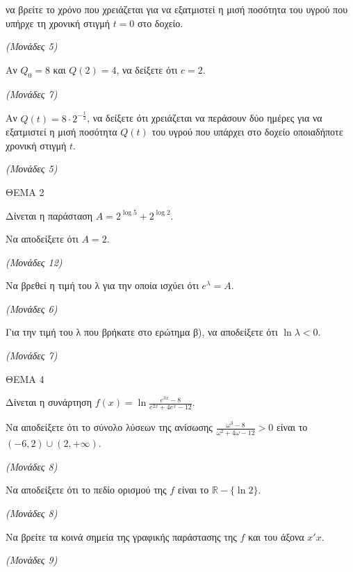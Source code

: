 \documentclass[11pt,a4paper,twoside]{book}
\newcommand{\monades}[1]{\hfill \textit{(Μονάδες #1)}}
\begin{document}
\begin{alist}
\item
  να βρείτε το χρόνο που χρειάζεται για να εξατμιστεί η μισή ποσότητα του υγρού που υπήρχε τη χρονική στιγμή $t = 0$ στο δοχείο.

\monades{5}

\item Αν $Q_{0} = 8$ και $Q(2) = 4$, να δείξετε ότι $c = 2$.

\monades{7}

\item Αν $Q(t) = 8 \cdot 2^{- \frac{t}{2}}$, να δείξετε ότι χρειάζεται να περάσουν δύο ημέρες για να εξατμιστεί η μισή ποσότητα $Q(t)$ του υγρού που υπάρχει στο δοχείο οποιαδήποτε χρονική στιγμή $t$.

\monades{5}
\end{alist}

\vspace{4mm}

ΘΕΜΑ 2

Δίνεται η παράσταση $A = 2^{\log 5} + 2^{\log 2}$.

\begin{alist}
\item Να αποδείξετε ότι $A = 2$.

\monades{12}

\item Να βρεθεί η τιμή του λ για την οποία ισχύει ότι $e^\lambda = A$.

\monades{6}

\item Για την τιμή του λ που βρήκατε στο ερώτημα β), να αποδείξετε ότι $\ln \lambda < 0$.

\monades{7}
\end{alist}

\vspace{4mm}

ΘΕΜΑ 4

Δίνεται η συνάρτηση $f(x) = \ln \frac{e^{3x} - 8}{e^{2x} + 4e^x - 12}$.

\begin{alist}
\item Να αποδείξετε ότι το σύνολο λύσεων της ανίσωσης $\frac{\omega^3 - 8}{\omega^2 + 4\omega - 12} > 0$ είναι το $(-6, 2) \cup (2, +\infty)$.

\monades{8}

\item Να αποδείξετε ότι το πεδίο ορισμού της $f$ είναι το $\mathbb{R} - \{\ln 2\}$.

\monades{8}

\item Να βρείτε τα κοινά σημεία της γραφικής παράστασης της $f$ και του άξονα $x'x$.

\monades{9}
\end{alist}
\end{document}
